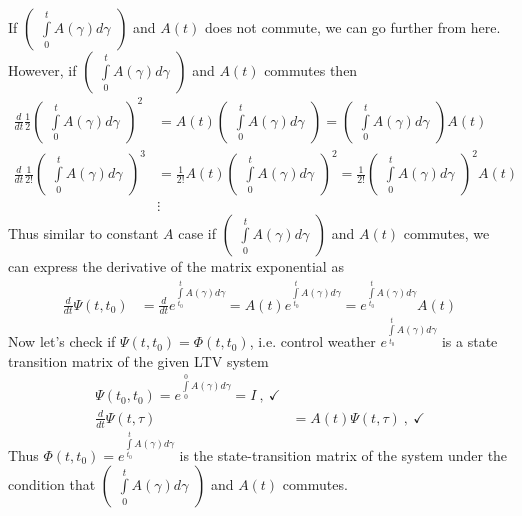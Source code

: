 \documentclass[twoside]{article}
\begin{document}
%
If $\begin{pmatrix} \int\limits_{0}^{t} A(\gamma) d\gamma \end{pmatrix}$ and $A(t)$ does not commute, we can go further from here. However, if $\begin{pmatrix} \int\limits_{0}^{t} A(\gamma) d\gamma \end{pmatrix}$ and $A(t)$ commutes then 
%
\begin{align*}
\frac{d}{dt} \frac{1}{2} \begin{pmatrix} \int\limits_{0}^{t} A(\gamma) d\gamma \end{pmatrix}^2 &=  A(t) \begin{pmatrix} \int\limits_{0}^{t} A(\gamma) d\gamma \end{pmatrix} 
= \begin{pmatrix} \int\limits_{0}^{t} A(\gamma) d\gamma \end{pmatrix} A(t) 
\\
\frac{d}{dt} \frac{1}{2 !} \begin{pmatrix} \int\limits_{0}^{t} A(\gamma) d\gamma \end{pmatrix}^3 &= \frac{1}{2 !}  A(t) \begin{pmatrix} \int\limits_{0}^{t} A(\gamma) d\gamma \end{pmatrix}^2
= \frac{1}{2 !} \begin{pmatrix} \int\limits_{0}^{t} A(\gamma) d\gamma \end{pmatrix}^2 A(t) 
\\
&\vdots
\end{align*}
%
Thus similar to constant $A$ case if $\begin{pmatrix} \int\limits_{0}^{t} A(\gamma) d\gamma \end{pmatrix}$ and $A(t)$ commutes, we can express the derivative of the matrix exponential as
%
\begin{align*}
\frac{d}{dt} \Psi(t,t_0) &= \frac{d}{dt} e^{ \int\limits_{t_0}^{t} A(\gamma) d\gamma }  = A(t) e^{ \int\limits_{t_0}^{t} A(\gamma) d\gamma } = e^{ \int\limits_{t_0}^{t} A(\gamma) d\gamma } A(t)
\end{align*}
% 
Now let's check if $\Psi(t,t_0) = \Phi(t,t_0)$, i.e. control weather $e^{ \int\limits_{t_0}^{t} A(\gamma) d\gamma }$ is a state transition matrix of the given LTV system
%
\begin{align*}
\Psi(t_0,t_0) = e^{ \int\limits_{0}^{0} A(\gamma) d\gamma } = I \ , \ \checkmark
\\
\frac{d}{dt} \Psi(t,\tau) &= A(t) \Psi(t,\tau) \ , \ \checkmark
\end{align*}
%
Thus $\Phi(t,t_0)  = e^{ \int\limits_{t_0}^{t} A(\gamma) d\gamma }$ is the state-transition matrix of the system under the condition that 
$\begin{pmatrix} \int\limits_{0}^{t} A(\gamma) d\gamma \end{pmatrix}$ and $A(t)$ commutes.

\end{document}
